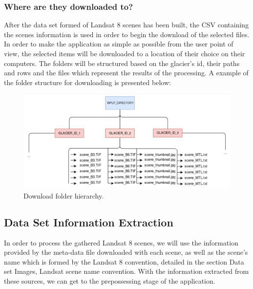 \documentclass[12pt, a4paper]{report}
\begin{document}
	\subsubsection{Where are they downloaded to?}
	After the data set formed of Landsat 8 scenes has been built, the CSV containing the scenes information is used in order to begin the download of the selected files. In order to make the application as simple as possible from the user point of view, the selected items will be downloaded to a location of their choice on their computers. The folders will be structured based on the glacier's id, their paths and rows and the files which represent the results of the processing. A example of the folder structure for downloading is presented below:
	\begin{figure}[H]
		\centering
		\includegraphics[scale=1.4]{download_folderhierarchy.png}
		\caption{Download folder hierarchy.}
		\label{fig:download_folders}
	\end{figure}
	
	\subsection{Data Set Information Extraction}
	In order to process the gathered Landsat 8 scenes, we will use the information provided by the meta-data file downloaded with each scene, as well as the scene's name which is formed by the Landsat 8 convention, detailed in the section Data set Images, Landsat scene name convention. With the information extracted from these sources, we can get to the prepossessing stage of the application.
	
\end{document}
